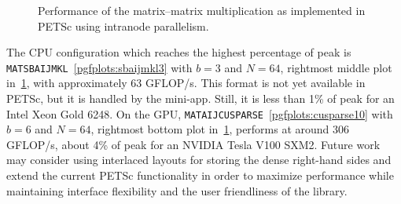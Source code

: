 \documentclass[3p,11pt]{elsarticle}
\newcommand{\pk}[1]{\texttt{#1}}
\begin{document}
\begin{figure}[!t]
   \caption{Performance of the matrix--matrix multiplication as implemented in PETSc using intranode parallelism. \label{fig:perfAXpar}}
\end{figure}


The CPU configuration which reaches the
highest percentage of peak is \pk{MATSBAIJMKL}~\ref{pgfplots:sbaijmkl3} with $b=3$
and $N=64$, rightmost middle plot in~\cref{fig:perfAXpar}, with approximately
63 GFLOP/s. This format is not yet available in PETSc, but it is handled by the
mini-app. Still, it is less than 1\% of peak for an Intel Xeon Gold 6248.
On the GPU, \pk{MATAIJCUSPARSE}~\ref{pgfplots:cusparse10} with $b=6$
and $N=64$, rightmost bottom plot in~\cref{fig:perfAXpar}, performs at around
306 GFLOP/s, about 4\% of peak for an NVIDIA Tesla V100 SXM2. Future work may
consider using interlaced layouts for storing the dense right-hand sides and extend the
current PETSc functionality in order to maximize performance while maintaining interface flexibility
and the user friendliness of the library.
\end{document}
